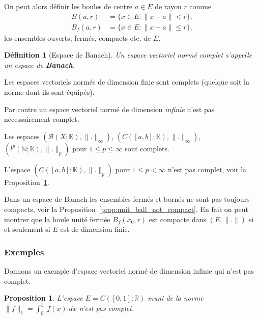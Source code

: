 \documentclass{article}
\newtheorem{proposition}[theorem]{Proposition}
\newtheorem{definition}{Définition}
\begin{document}
On peut alors définir les boules de centre $a \in E$ de rayon $r$ comme
\begin{align*}
    B(a, r) &= \{x \in E : \|x-a\| < r\}, \\
    B_f(a, r) &= \{x \in E : \|x-a\| \leq r\},
\end{align*}
les ensembles ouverts, fermés, compacts etc. de $E$.

\begin{definition}[Espace de Banach]
\label{def:banach}
Un espace vectoriel normé complet s'appelle un espace de \textbf{Banach}.
\end{definition}

Les espaces vectoriels normés de dimension finie sont complets (quelque soit la norme dont ils sont équipés).

Par contre un espace vectoriel normé de dimension \textit{infinie} n'est pas nécessairement complet.

Les espaces $(\mathcal{B}(X; \mathbb{K}), \|.\|_\infty)$, $(C([a, b]; \mathbb{K}), \|.\|_\infty)$, $(l^p(\mathbb{N}; \mathbb{K}), \|.\|_p)$ pour $1 \leq p \leq \infty$ sont complets.

L'espace $(C([a, b]; \mathbb{K}), \|.\|_p)$ pour $1 \leq p < \infty$ n'est pas complet, voir la Proposition~\ref{prop:C_not_banach}.

Dans un espace de Banach les ensembles fermés et bornés ne sont pas toujours compacts, voir la Proposition~\ref{prop:unit_ball_not_compact}. En fait on peut montrer que la boule unité fermée $B_f(x_0, r)$ est compacte dans $(E, \|.\|)$ si et seulement si $E$ est de dimension finie.

\subsubsection{Exemples}
Donnons un exemple d'espace vectoriel normé de dimension infinie qui n'est pas complet.

\begin{proposition}
\label{prop:C_not_banach}
L'espace $E = C([0, 1]; \mathbb{R})$ muni de la norme $\|f\|_1 = \int_0^1 |f(x)| dx$ n'est pas complet.
\end{proposition}
\end{document}
